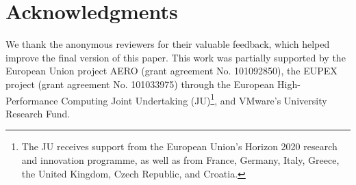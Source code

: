 \section*{Acknowledgments}
We thank the anonymous reviewers for their valuable feedback, which helped improve the final version of this paper.
This work was partially supported by the European Union project AERO (grant agreement No. 101092850), the EUPEX project (grant agreement No. 101033975) through the European High-Performance Computing Joint Undertaking (JU)\footnote{The JU receives support from the European Union’s Horizon 2020 research and innovation programme, as well as from France, Germany, Italy, Greece, the United Kingdom, Czech Republic, and Croatia.}, and VMware’s University Research Fund.
